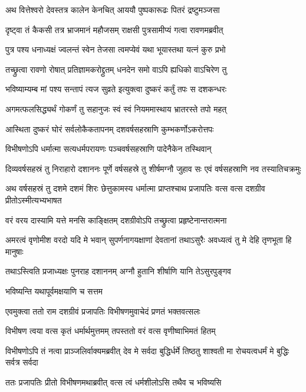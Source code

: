 \twolineshloka
{अथ वित्तेश्वरो देवस्तत्र कालेन केनचित्}
{आययौ पुष्पकारूढः पितरं द्रष्टुमञ्जसा} %

\twolineshloka
{दृष्ट्वा तं कैकसी तत्र भ्राजमानं महौजसम्}
{राक्षसी पुत्रसामीप्यं गत्वा रावणमब्रवीत्} %

\twolineshloka
{पुत्र पश्य धनाध्यक्षं ज्वलन्तं स्वेन तेजसा}
{त्वमप्येवं यथा भूयास्तथा यत्नं कुरु प्रभो} %

\twolineshloka
{तच्छ्रुत्वा रावणो रोषात् प्रतिज्ञामकरोद्द्रुतम्}
{धनदेन समो वाऽपि ह्यधिको वाऽचिरेण तु} %

\twolineshloka
{भविष्याम्यम्ब मां पश्य सन्तापं त्यज सुव्रते}
{इत्युक्त्वा दुष्करं कर्तुं तपः स दशकन्धरः} %

\twolineshloka
{अगमत्फलसिद्ध्यर्थं गोकर्णं तु सहानुजः}
{स्वं स्वं नियममास्थाय भ्रातरस्ते तपो महत्} %

\twolineshloka
{आस्थिता दुष्करं घोरं सर्वलोकैकतापनम्}
{दशवर्षसहस्राणि कुम्भकर्णोऽकरोत्तपः} %

\twolineshloka
{विभीषणोऽपि धर्मात्मा सत्यधर्मपरायणः}
{पञ्चवर्षसहस्राणि पादेनैकेन तस्थिवान्} %

\threelineshloka
{दिव्यवर्षसहस्रं तु निराहारो दशाननः}
{पूर्णे वर्षसहस्रे तु शीर्षमग्नौ जुहाव सः}
{एवं वर्षसहस्राणि नव तस्यातिचक्रमुः} %

\threelineshloka
{अथ वर्षसहस्रं तु दशमे दशमं शिरः}
{छेत्तुकामस्य धर्मात्मा प्राप्तश्चाथ प्रजापतिः}
{वत्स वत्स दशग्रीव प्रीतोऽस्मीत्यभ्यभाषत} %

\twolineshloka
{वरं वरय दास्यामि यत्ते मनसि काङ्क्षितम्}
{दशग्रीवोऽपि तच्छ्रुत्वा प्रहृष्टेनान्तरात्मना} %

\threelineshloka
{अमरत्वं वृणोमीश वरदो यदि मे भवान्}
{सुपर्णनागयक्षाणां देवतानां तथाऽसुरैः}
{अवध्यत्वं तु मे देहि तृणभूता हि मानुषाः} %

\twolineshloka
{तथाऽस्त्विति प्रजाध्यक्षः पुनराह दशाननम्}
{अग्नौ हुतानि शीर्षाणि यानि तेऽसुरपुङ्गव} %

\onelineshloka
{भविष्यन्ति यथापूर्वमक्षयाणि च सत्तम} %

\twolineshloka
{एवमुक्त्वा ततो राम दशग्रीवं प्रजापतिः}
{विभीषणमुवाचेदं प्रणतं भक्तवत्सलः} %

\twolineshloka
{विभीषण त्वया वत्स कृतं धर्मार्थमुत्तमम्}
{तपस्ततो वरं वत्स वृणीष्वाभिमतं हितम्} %

\threelineshloka
{विभीषणोऽपि तं नत्वा प्राञ्जलिर्वाक्यमब्रवीत्}
{देव मे सर्वदा बुद्धिर्धर्मे तिष्ठतु शाश्वती}
{मा रोचयत्वधर्मं मे बुद्धिः सर्वत्र सर्वदा} %

\twolineshloka
{ततः प्रजापतिः प्रीतो विभीषणमथाब्रवीत्}
{वत्स त्वं धर्मशीलोऽसि तथैव च भविष्यसि} %

